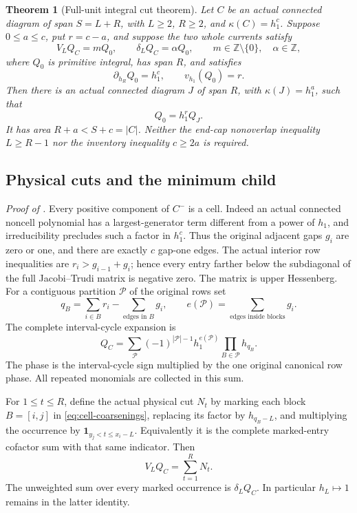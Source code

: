 \documentclass[11pt,a4paper]{amsart}
\numberwithin{equation}{section}
\theoremstyle{plain}
\newtheorem{theorem}{Theorem}[section]
\theoremstyle{definition}
\newcommand{\Z}{\mathbb Z}
\newcommand{\one}{\mathbf1}
\begin{document}
\begin{theorem}[Full-unit integral cut theorem]\label{thm:cell-cut}
Let \(C\) be an actual connected diagram of span \(S=L+R\), with \(L\ge2\),
\(R\ge2\), and \(\kappa(C)=h_1^c\).  Suppose \(0\le a\le c\), put \(r=c-a\),
and suppose the two whole currents satisfy
\[
 V_LQ_C=mQ_0,\qquad \delta_LQ_C=\alpha Q_0,
 \qquad m\in\Z\setminus\{0\},\quad\alpha\in\Z,
\]
where \(Q_0\) is primitive integral, has span \(R\), and satisfies
\begin{equation}\label{eq:cell-top-gates}
 \partial_{h_R}Q_0=h_1^c,\qquad v_{h_1}(Q_0)=r.
\end{equation}
Then there is an actual connected diagram \(J\) of span \(R\), with
\(\kappa(J)=h_1^a\), such that
\[
 Q_0=h_1^rQ_J.
\]
It has area \(R+a<S+c=|C|\).  Neither the end-cap nonoverlap inequality
\(L\ge R-1\) nor the inventory inequality \(c\ge2a\) is required.
\end{theorem}

\subsection{Physical cuts and the minimum child}

\noindent\emph{Proof of .}  Every positive component of \(C^-\) is a cell.  Indeed an actual connected
noncell polynomial has a largest-generator term different from a power of
\(h_1\), and irreducibility precludes such a factor in \(h_1^c\).
Thus the original adjacent gaps \(g_i\) are zero or one, and there are exactly
\(c\) gap-one edges.  The actual interior row inequalities are
\(r_i>g_{i-1}+g_i\); hence every entry farther below the subdiagonal of the
full Jacobi--Trudi matrix is negative zero.  The matrix is upper Hessenberg.
For a contiguous partition \(\mathcal P\) of the original rows set
\[
 q_B=\sum_{i\in B}r_i-\sum_{\text{edges in }B}g_i,
 \qquad e(\mathcal P)=\sum_{\text{edges inside blocks}}g_i.
\]
The complete interval-cycle expansion is
\begin{equation}\label{eq:cell-coarsenings}
 Q_C=\sum_{\mathcal P}(-1)^{|\mathcal P|-1}
                 h_1^{e(\mathcal P)}\prod_{B\in\mathcal P}h_{q_B}.
\end{equation}
The phase is the interval-cycle sign multiplied by the one original
canonical row phase.  All repeated monomials are collected in this sum.

For \(1\le t\le R\), define the actual physical cut \(N_t\) by marking each
block \(B=[i,j]\) in \eqref{eq:cell-coarsenings}, replacing its factor by
\(h_{q_B-L}\), and multiplying the occurrence by
\(\one_{y_j<t\le x_i-L}\).  Equivalently it is the complete marked-entry
cofactor sum with that same indicator.  Then
\begin{equation}\label{eq:physical-cut-sum}
 V_LQ_C=\sum_{t=1}^R N_t.
\end{equation}
The unweighted sum over every marked occurrence is \(\delta_LQ_C\).
In particular \(h_L\mapsto1\) remains in the latter identity.
\end{document}
